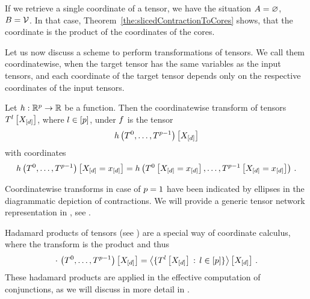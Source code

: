 If we retrieve a single coordinate of a tensor, we have the situation $A=\varnothing$, $B=\mathcal{V}$.
In that case, Theorem~\ref{the:slicedContractionToCores} shows, that the coordinate is the product of the coordinates of the cores. %

\label{sec:coordinatewiseTransforms}

Let us now discuss a scheme to perform transformations of tensors.
We call them coordinatewise, when the target tensor has the same variables as the input tensors, and each coordinate of the target tensor depends only on the respective coordinates of the input tensors. %

\begin{definition}
    \label{def:coordinatewiseTransform}
    Let $h: \mathbb{R}^{p} \rightarrow \mathbb{R}$ be a function.
    Then the coordinatewise transform of tensors $T^{l}\left[X_{[d]}\right]$, where $l\in[p]$, under $f$ is the tensor
    \begin{align*}
        {h}\left(T^{0},\ldots,T^{p-1}\right)\left[X_{[d]}\right]
    \end{align*}
    with coordinates
    \begin{align*}
        {h}\left(T^{0},\ldots,T^{p-1}\right)\left[X_{[d]}=x_{[d]}\right]
        = h\left(T^{0}\left[X_{[d]}=x_{[d]}\right],\ldots,T^{p-1}\left[X_{[d]}=x_{[d]}\right]\right) \, .
    \end{align*}
\end{definition}

Coordinatewise transforms in case of $p=1$ have been indicated by ellipses in the diagrammatic depiction of contractions.
We will provide a generic tensor network representation in , see .

\begin{example}
    Hadamard products of tensors (see ) are a special way of coordinate calculus, where the transform is the product and thus
    \begin{align*}
        {\cdot\,}\left(T^{0},\ldots,T^{p-1}\right)\left[X_{[d]}\right]
        = \left\langle \{T^{l}\left[X_{[d]}\right] \, : \, l\in[p] \}\right\rangle \left[ X_{[d]} \right] \, .
    \end{align*}
    These hadamard products are applied in the effective computation of conjunctions, as we will discuss in more detail in .
\end{example}

